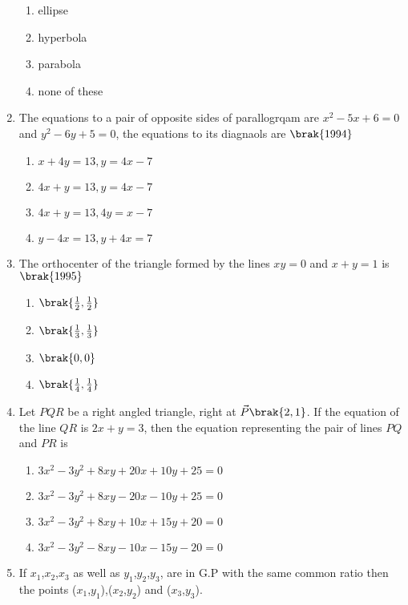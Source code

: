 \begin{enumerate}
\begin{multicols}{2}
\begin{enumerate}
       \item ellipse
       \item hyperbola
       \item parabola
       \item none of these
\end{enumerate}
\end{multicols}
\item The equations to a pair of opposite sides of parallogrqam are $x^2-5x+6=0$ and $y^2-6y+5=0$, the equations to its diagnaols are 
\hfill{$\brak{1994}$}
\begin{multicols}{2}
\begin{enumerate}
      \item $x+4y=13,y=4x-7$
    \item $4x+y=13,y=4x-7$
      \item $4x+y=13,4y=x-7$
        \item $y-4x=13,y+4x=7$
\end{enumerate}
\end{multicols}
\item The orthocenter of the triangle formed by the lines $xy=0$ and $x+y=1$ is 
\hfill{$\brak{1995}$}
\begin{multicols}{4}
\begin{enumerate}
      \item $\brak{\frac{1}{2},\frac{1}{2}}$
      \item $\brak{\frac{1}{3},\frac{1}{3}}$
      \item $\brak{0,0}$
      \item $\brak{\frac{1}{4},\frac{1}{4}}$
\end{enumerate}
\end{multicols}
\item Let $PQR$ be a right angled triangle, right at $\vec{P}\brak{2,1}$. If the equation of the line $QR$ is $2x+y=3$, then the equation representing the pair of lines $PQ$ and $PR$ is
\hfill {}
\begin{multicols}{2}
\begin{enumerate}
    \item $3x^2-3y^2+8xy+20x+10y+25=0$
    \item $3x^2-3y^2+8xy-20x-10y+25=0$
    \item $3x^2-3y^2+8xy+10x+15y+20=0$
    \item $3x^2-3y^2-8xy-10x-15y-20=0$
\end{enumerate}
\end{multicols}
\item If $x_1$,$x_2$,$x_3$ as well as $y_1$,$y_2$,$y_3$, are in G.P with the same common ratio then the points ($x_1$,$y_1$),($x_2$,$y_2$) and ($x_3$,$y_3$).

\end{enumerate}
